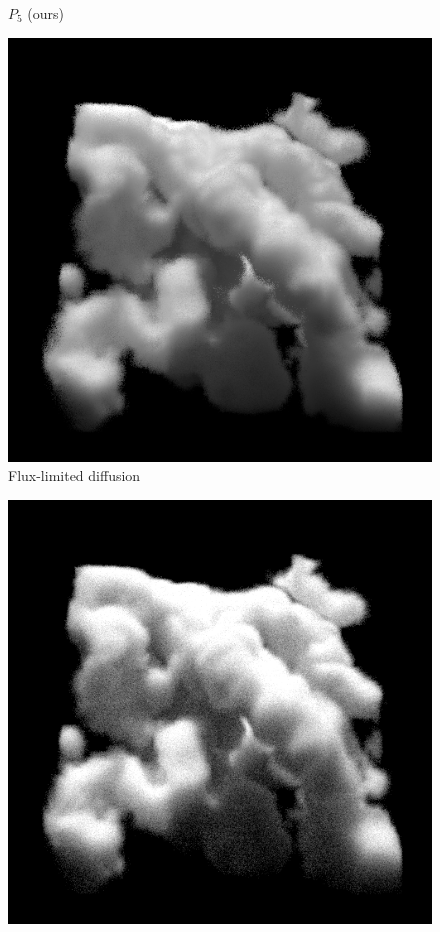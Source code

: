 \documentclass{egpubl}
\begin{document}
{\begin{subfigure}{0.24\linewidth}
\vspace{-0.17in}
\caption{$P_5$ (ours)}
\label{fig:nebulae_ours}
\label{fig:teaser_pn}
\end{subfigure}%
\hspace{0.002\linewidth}
\begin{subfigure}{0.24\linewidth}
\includegraphics[width=\linewidth]{nebulae_ms_fld.png}
\vspace{-0.17in}
\caption{Flux-limited diffusion}
\label{fig:teaser_fld}
\end{subfigure}%
\hspace{0.002\linewidth}
\begin{subfigure}{0.24\linewidth}
\includegraphics[width=\linewidth]{nebulae_ms_groundtruth.png}

\end{subfigure}}
\end{document}
